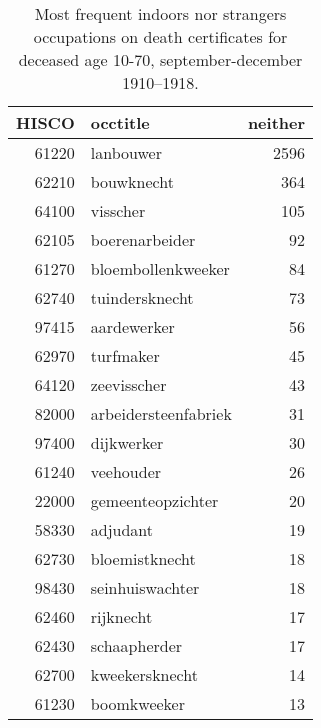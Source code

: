 \begin{table}

\caption{\label{tab:tab:topneither}Most frequent indoors nor strangers occupations on death certificates for deceased age 10-70, september-december 1910–1918.}
\centering
\begin{tabular}[t]{r|l|r}
\hline
HISCO & occtitle & neither\\
\hline
61220 & lanbouwer & 2596\\
\hline
62210 & bouwknecht & 364\\
\hline
64100 & visscher & 105\\
\hline
62105 & boerenarbeider & 92\\
\hline
61270 & bloembollenkweeker & 84\\
\hline
62740 & tuindersknecht & 73\\
\hline
97415 & aardewerker & 56\\
\hline
62970 & turfmaker & 45\\
\hline
64120 & zeevisscher & 43\\
\hline
82000 & arbeidersteenfabriek & 31\\
\hline
97400 & dijkwerker & 30\\
\hline
61240 & veehouder & 26\\
\hline
22000 & gemeenteopzichter & 20\\
\hline
58330 & adjudant & 19\\
\hline
62730 & bloemistknecht & 18\\
\hline
98430 & seinhuiswachter & 18\\
\hline
62460 & rijknecht & 17\\
\hline
62430 & schaapherder & 17\\
\hline
62700 & kweekersknecht & 14\\
\hline
61230 & boomkweeker & 13\\
\hline
\end{tabular}
\end{table}
